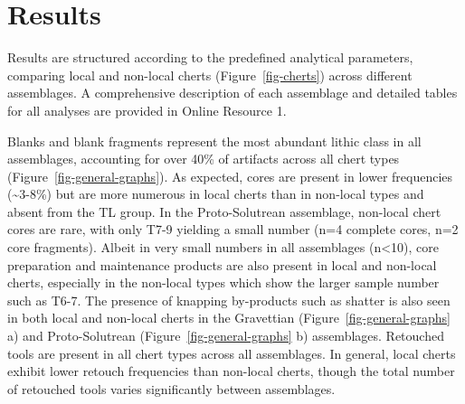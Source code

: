 \documentclass[
  a4paper,
  DIV=11,
  numbers=noendperiod]{scrreprt}
\begin{document}
\section{Results}\label{results-3}

Results are structured according to the predefined analytical
parameters, comparing local and non-local cherts
(Figure~\ref{fig-cherts}) across different assemblages. A comprehensive
description of each assemblage and detailed tables for all analyses are
provided in Online Resource 1.

Blanks and blank fragments represent the most abundant lithic class in
all assemblages, accounting for over 40\% of artifacts across all chert
types (Figure~\ref{fig-general-graphs}). As expected, cores are present
in lower frequencies (\textasciitilde3-8\%) but are more numerous in
local cherts than in non-local types and absent from the TL group. In
the Proto-Solutrean assemblage, non-local chert cores are rare, with
only T7-9 yielding a small number (n=4 complete cores, n=2 core
fragments). Albeit in very small numbers in all assemblages
(n\textless10), core preparation and maintenance products are also
present in local and non-local cherts, especially in the non-local types
which show the larger sample number such as T6-7. The presence of
knapping by-products such as shatter is also seen in both local and
non-local cherts in the Gravettian (Figure~\ref{fig-general-graphs} a)
and Proto-Solutrean (Figure~\ref{fig-general-graphs} b) assemblages.
Retouched tools are present in all chert types across all assemblages.
In general, local cherts exhibit lower retouch frequencies than
non-local cherts, though the total number of retouched tools varies
significantly between assemblages.
\end{document}

